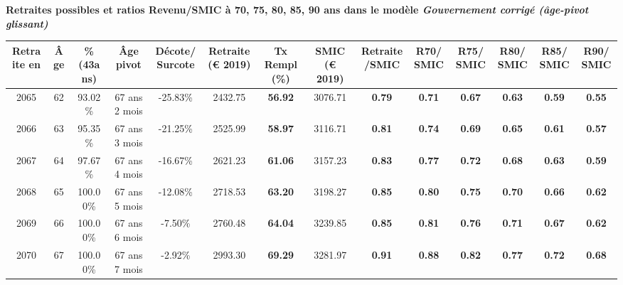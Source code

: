  \vspace{0.1cm} 
{\bf \noindent Retraites possibles et ratios Revenu/SMIC à 70, 75, 80, 85, 90 ans dans le modèle \emph{Gouvernement corrigé (âge-pivot glissant)}}  
 
\begin{adjustbox}{max width=\textwidth} 
\begin{tabular}[htb]{|c|c||c|c|c||c|c||c|c||c|c|c|c|c|} 
\hline 
 Retraite en &  Âge &  \%(43ans) &  Âge pivot &  Décote/Surcote &  Retraite (\euro{} 2019) &  Tx Rempl(\%) &  SMIC (\euro{} 2019) &  Retraite/SMIC &  R70/SMIC &  R75/SMIC &  R80/SMIC &  R85/SMIC &  R90/SMIC \\ 
\hline \hline 
 2065 &  62 &  93.02\% &  67 ans 2 mois &  -25.83\% &  2432.75 &  {\bf 56.92} &  3076.71 &  {\bf {\color{red} 0.79}} &  {\bf {\color{red} 0.71}} &  {\bf {\color{red} 0.67}} &  {\bf {\color{red} 0.63}} &  {\bf {\color{red} 0.59}} &  {\bf {\color{red} 0.55}} \\ 
\hline 
 2066 &  63 &  95.35\% &  67 ans 3 mois &  -21.25\% &  2525.99 &  {\bf 58.97} &  3116.71 &  {\bf {\color{red} 0.81}} &  {\bf {\color{red} 0.74}} &  {\bf {\color{red} 0.69}} &  {\bf {\color{red} 0.65}} &  {\bf {\color{red} 0.61}} &  {\bf {\color{red} 0.57}} \\ 
\hline 
 2067 &  64 &  97.67\% &  67 ans 4 mois &  -16.67\% &  2621.23 &  {\bf 61.06} &  3157.23 &  {\bf {\color{red} 0.83}} &  {\bf {\color{red} 0.77}} &  {\bf {\color{red} 0.72}} &  {\bf {\color{red} 0.68}} &  {\bf {\color{red} 0.63}} &  {\bf {\color{red} 0.59}} \\ 
\hline 
 2068 &  65 &  100.00\% &  67 ans 5 mois &  -12.08\% &  2718.53 &  {\bf 63.20} &  3198.27 &  {\bf {\color{red} 0.85}} &  {\bf {\color{red} 0.80}} &  {\bf {\color{red} 0.75}} &  {\bf {\color{red} 0.70}} &  {\bf {\color{red} 0.66}} &  {\bf {\color{red} 0.62}} \\ 
\hline 
 2069 &  66 &  100.00\% &  67 ans 6 mois &  -7.50\% &  2760.48 &  {\bf 64.04} &  3239.85 &  {\bf {\color{red} 0.85}} &  {\bf {\color{red} 0.81}} &  {\bf {\color{red} 0.76}} &  {\bf {\color{red} 0.71}} &  {\bf {\color{red} 0.67}} &  {\bf {\color{red} 0.62}} \\ 
\hline 
 2070 &  67 &  100.00\% &  67 ans 7 mois &  -2.92\% &  2993.30 &  {\bf 69.29} &  3281.97 &  {\bf {\color{red} 0.91}} &  {\bf {\color{red} 0.88}} &  {\bf {\color{red} 0.82}} &  {\bf {\color{red} 0.77}} &  {\bf {\color{red} 0.72}} &  {\bf {\color{red} 0.68}} \\ 
\hline 
\hline 
\end{tabular} 
\end{adjustbox} 
 
